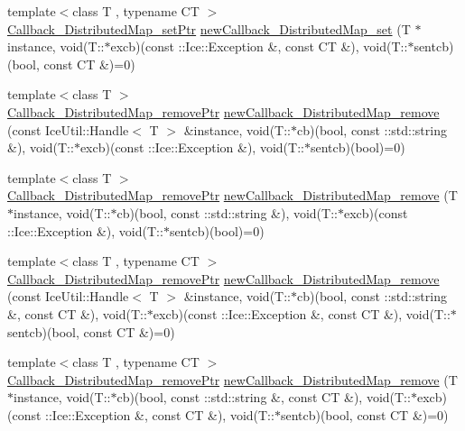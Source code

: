 \begin{DoxyCompactItemize}
\item 
{\footnotesize template$<$class T , typename CT $>$ }\\\hyperlink{namespace_global_table_a8196b91ca3241e16fd9aac727da95e02}{Callback\_\-DistributedMap\_\-setPtr} \hyperlink{namespace_global_table_a8c632af2f4eaf774020b7c1502a7b529}{newCallback\_\-DistributedMap\_\-set} (T $\ast$instance, void(T::$\ast$excb)(const ::Ice::Exception \&, const CT \&), void(T::$\ast$sentcb)(bool, const CT \&)=0)
\item 
{\footnotesize template$<$class T $>$ }\\\hyperlink{namespace_global_table_a38ad32022b6559c698996becbe357749}{Callback\_\-DistributedMap\_\-removePtr} \hyperlink{namespace_global_table_a7b5e731046480df6d5b261d98247949a}{newCallback\_\-DistributedMap\_\-remove} (const IceUtil::Handle$<$ T $>$ \&instance, void(T::$\ast$cb)(bool, const ::std::string \&), void(T::$\ast$excb)(const ::Ice::Exception \&), void(T::$\ast$sentcb)(bool)=0)
\item 
{\footnotesize template$<$class T $>$ }\\\hyperlink{namespace_global_table_a38ad32022b6559c698996becbe357749}{Callback\_\-DistributedMap\_\-removePtr} \hyperlink{namespace_global_table_a9cada3fa6913d09443209b780d105769}{newCallback\_\-DistributedMap\_\-remove} (T $\ast$instance, void(T::$\ast$cb)(bool, const ::std::string \&), void(T::$\ast$excb)(const ::Ice::Exception \&), void(T::$\ast$sentcb)(bool)=0)
\item 
{\footnotesize template$<$class T , typename CT $>$ }\\\hyperlink{namespace_global_table_a38ad32022b6559c698996becbe357749}{Callback\_\-DistributedMap\_\-removePtr} \hyperlink{namespace_global_table_a604e68e3859a1b769d2998057fbe7922}{newCallback\_\-DistributedMap\_\-remove} (const IceUtil::Handle$<$ T $>$ \&instance, void(T::$\ast$cb)(bool, const ::std::string \&, const CT \&), void(T::$\ast$excb)(const ::Ice::Exception \&, const CT \&), void(T::$\ast$sentcb)(bool, const CT \&)=0)
\item 
{\footnotesize template$<$class T , typename CT $>$ }\\\hyperlink{namespace_global_table_a38ad32022b6559c698996becbe357749}{Callback\_\-DistributedMap\_\-removePtr} \hyperlink{namespace_global_table_aaabc65b726d773b117dc0981cdc68b39}{newCallback\_\-DistributedMap\_\-remove} (T $\ast$instance, void(T::$\ast$cb)(bool, const ::std::string \&, const CT \&), void(T::$\ast$excb)(const ::Ice::Exception \&, const CT \&), void(T::$\ast$sentcb)(bool, const CT \&)=0)

\end{DoxyCompactItemize}
